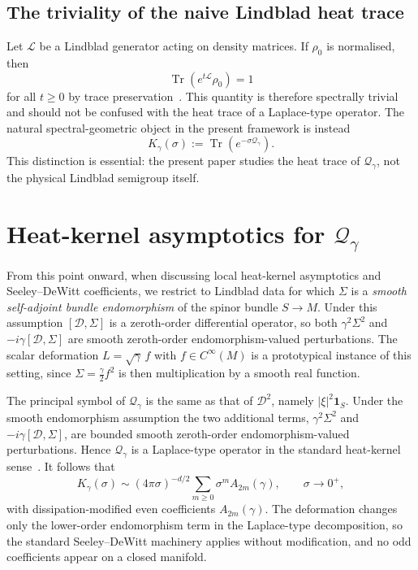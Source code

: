 \documentclass[11pt,a4paper]{article}
\numberwithin{equation}{section}
\theoremstyle{definition}
\newcommand{\cD}{\mathcal{D}}
\newcommand{\cL}{\mathcal{L}}
\newcommand{\Qg}{\mathcal{Q}_\gamma}
\newcommand{\Sig}{\Sigma}
\newcommand{\Tr}{\operatorname{Tr}}
\begin{document}
\subsection{The triviality of the naive Lindblad heat trace}

Let $\cL$ be a Lindblad generator acting on density matrices. If $\rho_0$
is normalised, then
\begin{equation}
\Tr(e^{t \cL}\rho_0)=1
\end{equation}
for all $t\ge 0$ by trace
preservation~\cite{Lindblad1976,GoriniKossakowskiSudarshan1976}. This
quantity is therefore spectrally trivial and should not be confused with
the heat trace of a Laplace-type operator. The natural spectral-geometric
object in the present framework is instead
\begin{equation}
K_\gamma(\sigma):=\Tr\!\left(e^{-\sigma\Qg}\right).
\end{equation}
This distinction is essential: the present paper studies the heat trace
of $\Qg$, not the physical Lindblad semigroup itself.

\section{Heat-kernel asymptotics for $\mathcal{Q}_\gamma$}
\label{sec:heatkernel}

From this point onward, when discussing local heat-kernel asymptotics
and Seeley--DeWitt coefficients, we restrict to Lindblad data for which
$\Sig$ is a \emph{smooth self-adjoint bundle endomorphism} of the spinor
bundle $S\to M$. Under this assumption $[\cD,\Sig]$ is a zeroth-order
differential operator, so both $\gamma^2\Sig^2$ and $-i\gamma[\cD,\Sig]$
are smooth zeroth-order endomorphism-valued perturbations. The scalar
deformation $L=\sqrt{\gamma}\,f$ with $f\in C^\infty(M)$ is a
prototypical instance of this setting, since $\Sig=\frac{\gamma}{2}f^2$
is then multiplication by a smooth real function.

The principal symbol of $\Qg$ is the same as that of $\cD^2$, namely
$|\xi|^2\mathbf{1}_S$. Under the smooth endomorphism assumption the two
additional terms, $\gamma^2\Sig^2$ and $-i\gamma[\cD,\Sig]$, are
bounded smooth zeroth-order endomorphism-valued perturbations. Hence
$\Qg$ is a Laplace-type operator in the standard
heat-kernel sense~\cite{Vassilevich2003,Gilkey1995}. It follows that
\begin{equation}
K_\gamma(\sigma)\sim (4\pi\sigma)^{-d/2}\sum_{m\ge 0}\sigma^m A_{2m}(\gamma),
\qquad \sigma\to 0^+,
\end{equation}
with dissipation-modified even coefficients $A_{2m}(\gamma)$. The
deformation changes only the lower-order endomorphism term in the
Laplace-type decomposition, so the standard Seeley--DeWitt machinery
applies without modification, and no odd coefficients appear on a closed
manifold.
\end{document}

